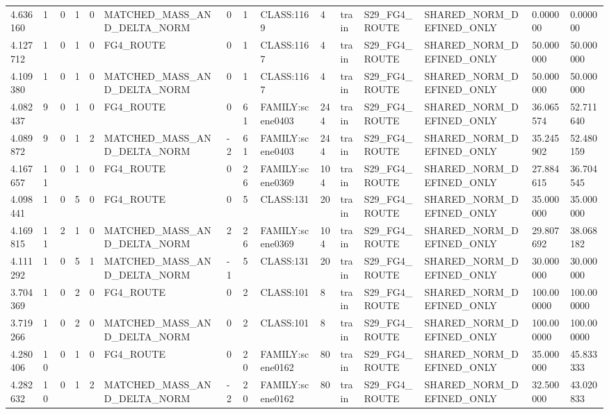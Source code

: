 \begin{tabular}{lllllllllllllll}
4.636160 & 1 & 0 & 1 & 0 & MATCHED\_MASS\_AND\_DELTA\_NORM & 0 & 1 & CLASS:1169 & 4 & train & S29\_FG4\_ROUTE & SHARED\_NORM\_DEFINED\_ONLY & 0.000000 & 0.000000 \\
4.127712 & 1 & 0 & 1 & 0 & FG4\_ROUTE & 0 & 1 & CLASS:1167 & 4 & train & S29\_FG4\_ROUTE & SHARED\_NORM\_DEFINED\_ONLY & 50.000000 & 50.000000 \\
4.109380 & 1 & 0 & 1 & 0 & MATCHED\_MASS\_AND\_DELTA\_NORM & 0 & 1 & CLASS:1167 & 4 & train & S29\_FG4\_ROUTE & SHARED\_NORM\_DEFINED\_ONLY & 50.000000 & 50.000000 \\
4.082437 & 9 & 0 & 1 & 0 & FG4\_ROUTE & 0 & 61 & FAMILY:scene0403 & 244 & train & S29\_FG4\_ROUTE & SHARED\_NORM\_DEFINED\_ONLY & 36.065574 & 52.711640 \\
4.089872 & 9 & 0 & 1 & 2 & MATCHED\_MASS\_AND\_DELTA\_NORM & -2 & 61 & FAMILY:scene0403 & 244 & train & S29\_FG4\_ROUTE & SHARED\_NORM\_DEFINED\_ONLY & 35.245902 & 52.480159 \\
4.167657 & 11 & 0 & 1 & 0 & FG4\_ROUTE & 0 & 26 & FAMILY:scene0369 & 104 & train & S29\_FG4\_ROUTE & SHARED\_NORM\_DEFINED\_ONLY & 27.884615 & 36.704545 \\
4.098441 & 1 & 0 & 5 & 0 & FG4\_ROUTE & 0 & 5 & CLASS:131 & 20 & train & S29\_FG4\_ROUTE & SHARED\_NORM\_DEFINED\_ONLY & 35.000000 & 35.000000 \\
4.169815 & 11 & 2 & 1 & 0 & MATCHED\_MASS\_AND\_DELTA\_NORM & 2 & 26 & FAMILY:scene0369 & 104 & train & S29\_FG4\_ROUTE & SHARED\_NORM\_DEFINED\_ONLY & 29.807692 & 38.068182 \\
4.111292 & 1 & 0 & 5 & 1 & MATCHED\_MASS\_AND\_DELTA\_NORM & -1 & 5 & CLASS:131 & 20 & train & S29\_FG4\_ROUTE & SHARED\_NORM\_DEFINED\_ONLY & 30.000000 & 30.000000 \\
3.704369 & 1 & 0 & 2 & 0 & FG4\_ROUTE & 0 & 2 & CLASS:101 & 8 & train & S29\_FG4\_ROUTE & SHARED\_NORM\_DEFINED\_ONLY & 100.000000 & 100.000000 \\
3.719266 & 1 & 0 & 2 & 0 & MATCHED\_MASS\_AND\_DELTA\_NORM & 0 & 2 & CLASS:101 & 8 & train & S29\_FG4\_ROUTE & SHARED\_NORM\_DEFINED\_ONLY & 100.000000 & 100.000000 \\
4.280406 & 10 & 0 & 1 & 0 & FG4\_ROUTE & 0 & 20 & FAMILY:scene0162 & 80 & train & S29\_FG4\_ROUTE & SHARED\_NORM\_DEFINED\_ONLY & 35.000000 & 45.833333 \\
4.282632 & 10 & 0 & 1 & 2 & MATCHED\_MASS\_AND\_DELTA\_NORM & -2 & 20 & FAMILY:scene0162 & 80 & train & S29\_FG4\_ROUTE & SHARED\_NORM\_DEFINED\_ONLY & 32.500000 & 43.020833 \\

\end{tabular}
